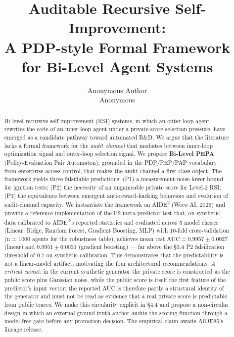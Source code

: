 \documentclass{article}
\title{\textbf{Auditable Recursive Self-Improvement:\\[0.2em]
       A PDP-style Formal Framework for Bi-Level Agent Systems}}
\author{Anonymous Author \\ Anonymous}
\date{}
\theoremstyle{definition}
\begin{document}
\maketitle


\setcounter{tocdepth}{2}
\makeatletter
\let\oldsection\section
\renewcommand{\section}[1]{\oldsection{#1}\setcounter{subsection}{0}}
\makeatother


\begin{abstract}
\noindent Bi-level recursive self-improvement (RSI) systems, in which an outer-loop agent rewrites the code of an inner-loop agent under a private-score selection pressure, have emerged as a candidate pathway toward automated R\&D. We argue that the literature lacks a formal framework for the \emph{audit channel} that mediates between inner-loop optimization signal and outer-loop selection signal. We propose \textbf{Bi-Level PEPA} (Policy-Evaluation Pair Automaton), grounded in the PDP/PEP/PAP vocabulary from enterprise access control, that makes the audit channel a first-class object. The framework yields three falsifiable predictions: (P1) a measurement-noise lower bound for ignition tests; (P2) the necessity of an ungameable private score for Level-2 RSI; (P3) the equivalence between emergent anti-reward-hacking behaviors and evolution of audit-channel capacity. We instantiate the framework on AIDE\textsuperscript{2} (Weco AI, 2026) and provide a reference implementation of the P2 meta-predictor test that, on synthetic data calibrated to AIDE\textsuperscript{2}'s reported statistics and evaluated across 5 model classes (Linear, Ridge, Random Forest, Gradient Boosting, MLP) with 10-fold cross-validation (n = 1000 agents for the robustness table), achieves mean test $\text{AUC} = 0.9957 \pm 0.0027$ (linear) and $0.9951 \pm 0.0031$ (gradient boosting) --- far above the §3.4 P2 falsification threshold of $0.7$ on synthetic calibration. This demonstrates that the predictability is not a linear-model artifact, motivating the four architectural recommendations. \emph{A critical caveat:} in the current synthetic generator the private score is constructed as the public score plus Gaussian noise, while the public score is itself the first feature of the predictor's input vector; the reported AUC is therefore partly a structural identity of the generator and must not be read as evidence that a real private score is predictable from public traces. We make this circularity explicit in \S4.4 and propose a non-circular design in which an external ground-truth anchor audits the scoring function through a model-free gate before any promotion decision. The empirical claim awaits AIDE85's lineage release.
\end{abstract}
\end{document}
